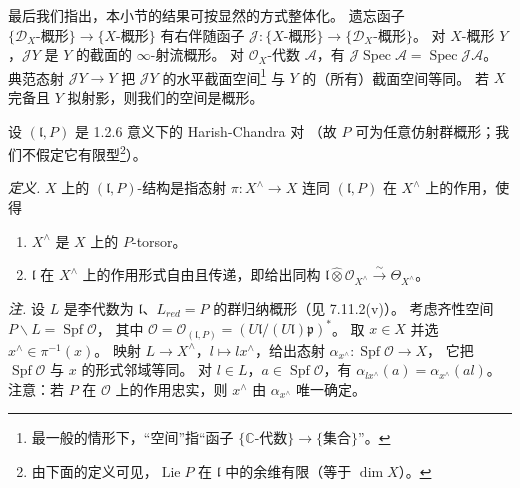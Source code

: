 最后我们指出，本小节的结果可按显然的方式整体化。
遗忘函子 $\{\mathcal{D}_X\text{-概形}\}\to\{X\text{-概形}\}$ 有右伴随函子
$\mathcal{J}: \{X\text{-概形}\}\to\{\mathcal{D}_X\text{-概形}\}$。
对 $X$-概形 $Y$，$\mathcal{J}Y$ 是 $Y$ 的截面的 $\infty$-射流概形。
对 $\mathcal{O}_X$-代数 $\mathcal{A}$，有 $\mathcal{J}\operatorname{Spec}\mathcal{A}=\operatorname{Spec}\mathcal{J}\mathcal{A}$。
典范态射 $\mathcal{J}Y\to Y$ 把 $\mathcal{J}Y$ 的水平截面空间\footnote{最一般的情形下，“空间”指“函子 $\{\mathbb{C}\text{-代数}\}\to\{\text{集合}\}$”。}
与 $Y$ 的（所有）截面空间等同。
若 $X$ 完备且 $Y$ 拟射影，则我们的空间是概形。

 设 $(\mathfrak{l},P)$ 是 1.2.6 意义下的 Harish-Chandra 对
（故 $P$ 可为任意仿射群概形；我们不假定它有限型\footnote{由下面的定义可见，$\operatorname{Lie} P$ 在 $\mathfrak{l}$ 中的余维有限（等于 $\dim X$）。}）。

\emph{定义.} $X$ 上的 $(\mathfrak{l},P)$-结构是指态射 $\pi: X^{\wedge}\to X$
连同 $(\mathfrak{l},P)$ 在 $X^{\wedge}$ 上的作用，使得
\begin{enumerate}[label=(\roman*),leftmargin=2.2em]
\item $X^{\wedge}$ 是 $X$ 上的 $P$-torsor。
\item $\mathfrak{l}$ 在 $X^{\wedge}$ 上的作用形式自由且传递，即给出同构
  $\mathfrak{l}\hat{\otimes}\mathcal{O}_{X^{\wedge}}\overset{\sim}{\to}\Theta_{X^{\wedge}}$。
\end{enumerate}

\emph{注.} 设 $L$ 是李代数为 $\mathfrak{l}$、$L_{red}=P$ 的群归纳概形（见 7.11.2(v)）。
考虑齐性空间 $P\backslash L=\operatorname{Spf}\mathcal{O}$，
其中 $\mathcal{O}=\mathcal{O}_{(\mathfrak{l},P)}=(U\mathfrak{l}/(U\mathfrak{l})\mathfrak{p})^*$。
取 $x\in X$ 并选 $x^{\wedge}\in\pi^{-1}(x)$。
映射 $L\to X^{\wedge}$，$l\mapsto lx^{\wedge}$，给出态射
$\alpha_{x^{\wedge}}: \operatorname{Spf}\mathcal{O}\to X$，
它把 $\operatorname{Spf}\mathcal{O}$ 与 $x$ 的形式邻域等同。
对 $l\in L$，$a\in\operatorname{Spf}\mathcal{O}$，有 $\alpha_{lx^{\wedge}}(a)=\alpha_{x^{\wedge}}(al)$。
注意：若 $P$ 在 $\mathcal{O}$ 上的作用忠实，则 $x^{\wedge}$ 由 $\alpha_{x^{\wedge}}$ 唯一确定。

